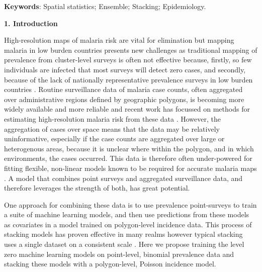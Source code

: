 \documentclass[11pt]{article}
\begin{document}
{{\bf Keywords}: Spatial statistics; Ensemble; Stacking; Epidemiology.
}\\


\setlength{\parindent}{0pt}

{\bf 1. Introduction}



High-resolution maps of malaria risk are vital for elimination but mapping malaria in low burden countries presents new challenges as traditional mapping of prevalence from cluster-level surveys \citep{gething2011new, bhatt2017improved, gething2012long, bhatt2015effect} is often not effective  because, firstly, so few individuals are infected that most surveys will detect zero cases, and secondly, because of the lack of nationally representative prevalence surveys in low burden countries \citep{sturrock2016mapping, sturrock2014fine}. 
Routine surveillance data of malaria case counts, often aggregated over administrative regions defined by geographic polygons, is becoming more widely available and more reliable and recent work has focussed on methods for estimating high-resolution malaria risk from these data \citep{sturrock2014fine, wilson2017pointless, law2018variational, taylor2017continuous, li2012log}. 
However, the aggregation of cases over space means that the data may be relatively uninformative, especially if the case counts are aggregated over large or heterogenous areas, because it is unclear where within the polygon, and in which environments, the cases occurred. 
This data is therefore often under-powered for fitting flexible, non-linear models known to be required for accurate malaria maps \cite{bhatt2017improved, bhatt2015effect}. 
A model that combines point surveys and aggregated surveillance data, and therefore leverages the strength of both, has great potential.
 
One approach for combining these data is to use prevalence point-surveys to train a suite of machine learning models, and then use predictions from these models as covariates in a model trained on polygon-level incidence data. 
This process of stacking models has proven effective in many realms however typical stacking uses a single dataset on a consistent scale \citep{sill2009feature, bhatt2017improved}. 
Here we propose training the level zero machine learning models on point-level, binomial prevalence data and stacking these models with a polygon-level, Poisson incidence model. 
\end{document}
